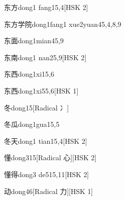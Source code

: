 \begin{entry}{东方}{dong1 fang1}{5,4}[HSK 2]
\end{entry}

\begin{entry}{东方学院}{dong1fang1 xue2yuan4}{5,4,8,9}
\end{entry}

\begin{entry}{东面}{dong1mian4}{5,9}
\end{entry}

\begin{entry}{东南}{dong1 nan2}{5,9}[HSK 2]
\end{entry}

\begin{entry}{东西}{dong1xi1}{5,6}
\end{entry}

\begin{entry}{东西}{dong1xi5}{5,6}[HSK 1]
\end{entry}

\begin{entry}{冬}{dong1}{5}[Radical 冫]
\end{entry}

\begin{entry}{冬瓜}{dong1gua1}{5,5}
\end{entry}

\begin{entry}{冬天}{dong1 tian1}{5,4}[HSK 2]
\end{entry}

\begin{entry}{懂}{dong3}{15}[Radical 心][HSK 2]
\end{entry}

\begin{entry}{懂得}{dong3 de5}{15,11}[HSK 2]
\end{entry}

\begin{entry}{动}{dong4}{6}[Radical 力][HSK 1]
\end{entry}

